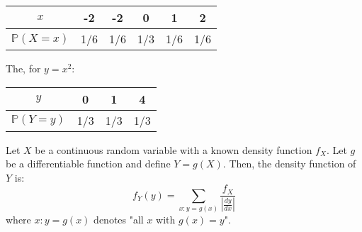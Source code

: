 \documentclass[titlepage, 12pt, leqno]{article}
\begin{document}
\vspace{10px}
\begin{center}
\begin{tabular}{c|c c c c c}
    $x$ & -2 & -2 & 0 & 1 & 2 \\
    \hline
    $\mathbb{P}(X=x)$ & 1/6 & 1/6 & 1/3 & 1/6 & 1/6
\end{tabular}
\end{center}
\vspace{10px}
The, for $y = x^2$:
\begin{center}
\begin{tabular}{c|c c c}
    $y$ & 0 & 1 & 4 \\
    \hline
    $\mathbb{P}(Y=y)$ & 1/3 & 1/3 & 1/3
\end{tabular}
\end{center}
\vspace{10px}

Let $X$ be a continuous random variable with a known density function $f_X$. Let
$g$ be a differentiable function and define $Y=g(X)$. Then, the density function
of $Y$ is:
\[
f_Y(y) = \sum_{x:y=g(x)} \frac{f_X}{\left|\frac{dy}{dx}\right|}
\]
where $x:y=g(x)$ denotes "all $x$ with $g(x) = y$".
\end{document}
